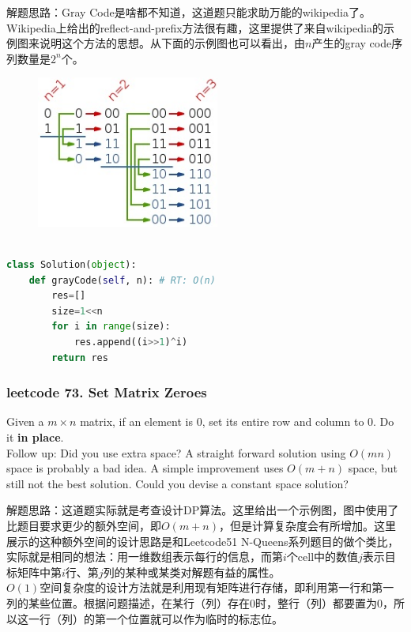 \documentclass[a4paper,10pt]{article}
\begin{document}
\begin{CJK*}{UTF8}{gbsn}
\noindent 解题思路：Gray Code是啥都不知道，这道题只能求助万能的wikipedia了。Wikipedia上给出的reflect-and-prefix方法很有趣，这里提供了来自wikipedia的示例图来说明这个方法的思想。从下面的示例图也可以看出，由$n$产生的gray code序列数量是$2^n$个。
\end{CJK*}

\begin{figure}[h]
    \includegraphics[width=6cm]{leetcode89.jpg}
    \centering \\
\end{figure}

\begin{lstlisting}[language=Python, caption=Problem89. Gray Code]

class Solution(object):
    def grayCode(self, n): # RT: O(n)
        res=[]
        size=1<<n
        for i in range(size):
            res.append((i>>1)^i)
        return res
\end{lstlisting}


\subsubsection{leetcode 73. Set Matrix Zeroes}
Given a $m \times n$ matrix, if an element is 0, set its entire row and column to 0. Do it \textbf{in place}. \\

\noindent Follow up: Did you use extra space? A straight forward solution using $O(mn)$ space is probably a bad idea. A simple improvement uses $O(m + n)$ space, but still not the best solution. Could you devise a constant space solution?\\

\begin{CJK*}{UTF8}{gbsn}
\noindent 解题思路：这道题实际就是考查设计DP算法。这里给出一个示例图，图中使用了比题目要求更少的额外空间，即$O(m+n)$，但是计算复杂度会有所增加。这里展示的这种额外空间的设计思路是和Leetcode51 N-Queens系列题目的做个类比，实际就是相同的想法：用一维数组表示每行的信息，而第$i$个cell中的数值$j$表示目标矩阵中第$i$行、第$j$列的某种或某类对解题有益的属性。\\

$O(1)$空间复杂度的设计方法就是利用现有矩阵进行存储，即利用第一行和第一列的某些位置。根据问题描述，在某行（列）存在0时，整行（列）都要置为0，所以这一行（列）的第一个位置就可以作为临时的标志位。
\end{CJK*}
\end{document}
